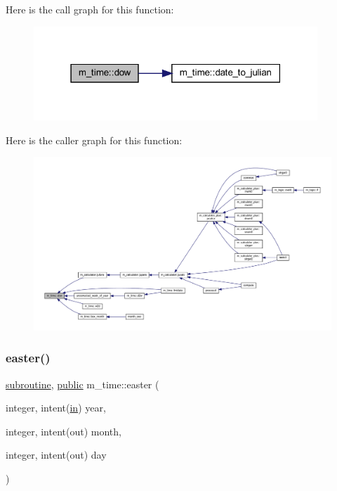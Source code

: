 Here is the call graph for this function\+:
\nopagebreak
\begin{figure}[H]
\begin{center}
\leavevmode
\includegraphics[width=303pt]{namespacem__time_adfda8a89820b8d0ad4581a14896e4ce5_cgraph}
\end{center}
\end{figure}
Here is the caller graph for this function\+:
\nopagebreak
\begin{figure}[H]
\begin{center}
\leavevmode
\includegraphics[width=350pt]{namespacem__time_adfda8a89820b8d0ad4581a14896e4ce5_icgraph}
\end{center}
\end{figure}
\mbox{\label{namespacem__time_af3c98ac7124f9fe2584cc76688b00094}} 
\subsubsection{\texorpdfstring{easter()}{easter()}}
{\footnotesize\ttfamily \hyperlink{M__stopwatch_83_8txt_acfbcff50169d691ff02d4a123ed70482}{subroutine}, \hyperlink{M__stopwatch_83_8txt_a2f74811300c361e53b430611a7d1769f}{public} m\+\_\+time\+::easter (\begin{DoxyParamCaption}\item[{integer, intent(\hyperlink{M__journal_83_8txt_afce72651d1eed785a2132bee863b2f38}{in})}]{year,  }\item[{integer, intent(out)}]{month,  }\item[{integer, intent(out)}]{day }\end{DoxyParamCaption})}



